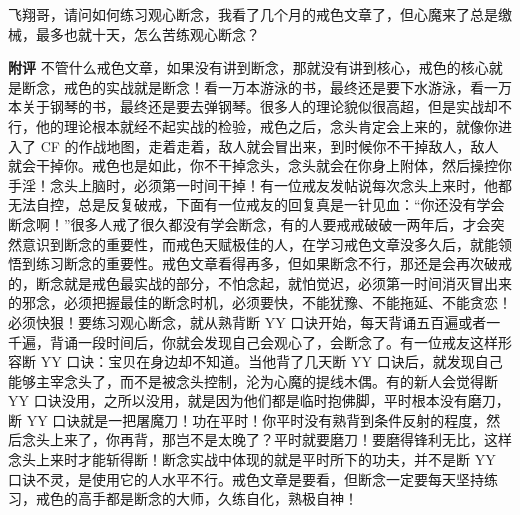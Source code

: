 \begin{case}
    飞翔哥，请问如何练习观心断念，我看了几个月的戒色文章了，但心魔来了总是缴械，最多也就十天，怎么苦练观心断念？

    \textbf{附评} 不管什么戒色文章，如果没有讲到断念，那就没有讲到核心，戒色的核心就是断念，戒色的实战就是断念！看一万本游泳的书，最终还是要下水游泳，看一万本关于钢琴的书，最终还是要去弹钢琴。很多人的理论貌似很高超，但是实战却不行，他的理论根本就经不起实战的检验，戒色之后，念头肯定会上来的，就像你进入了 CF 的作战地图，走着走着，敌人就会冒出来，到时候你不干掉敌人，敌人就会干掉你。戒色也是如此，你不干掉念头，念头就会在你身上附体，然后操控你手淫！念头上脑时，必须第一时间干掉！有一位戒友发帖说每次念头上来时，他都无法自控，总是反复破戒，下面有一位戒友的回复真是一针见血：“你还没有学会断念啊！”很多人戒了很久都没有学会断念，有的人要戒戒破破一两年后，才会突然意识到断念的重要性，而戒色天赋极佳的人，在学习戒色文章没多久后，就能领悟到练习断念的重要性。戒色文章看得再多，但如果断念不行，那还是会再次破戒的，断念就是戒色最实战的部分，不怕念起，就怕觉迟，必须第一时间消灭冒出来的邪念，必须把握最佳的断念时机，必须要快，不能犹豫、不能拖延、不能贪恋！必须快狠！要练习观心断念，就从熟背断 YY 口诀开始，每天背诵五百遍或者一千遍，背诵一段时间后，你就会发现自己会观心了，会断念了。有一位戒友这样形容断 YY 口诀：宝贝在身边却不知道。当他背了几天断 YY 口诀后，就发现自己能够主宰念头了，而不是被念头控制，沦为心魔的提线木偶。有的新人会觉得断 YY 口诀没用，之所以没用，就是因为他们都是临时抱佛脚，平时根本没有磨刀，断 YY 口诀就是一把屠魔刀！功在平时！你平时没有熟背到条件反射的程度，然后念头上来了，你再背，那岂不是太晚了？平时就要磨刀！要磨得锋利无比，这样念头上来时才能斩得断！断念实战中体现的就是平时所下的功夫，并不是断 YY 口诀不灵，是使用它的人水平不行。戒色文章是要看，但断念一定要每天坚持练习，戒色的高手都是断念的大师，久练自化，熟极自神！
\end{case}

